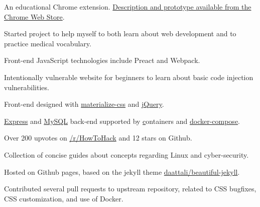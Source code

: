 

\begin{cventries}
  {
    \begin{cvitems}
      \item{An educational Chrome extension. \href{https://chrome.google.com/webstore/detail/mind-matter/ailffedpjgpjbdadlieaccchpcdiafjc}{Description and prototype available from the Chrome Web Store}.}
      \item{Started project to help myself to both learn about web development and to practice medical vocabulary.}
      \item{Front-end JavaScript technologies include Preact and Webpack.}
    \end{cvitems}
  }
  {
    \begin{cvitems}
      \item{Intentionally vulnerable website for beginners to learn about basic code injection vulnerabilities.}
      \item{Front-end designed with \href{http://materializecss.com/}{materialize-css} and \href{https://jquery.com/}{jQuery}.}
      \item{\href{https://expressjs.com/}{Express} and \href{https://www.mysql.com/}{MySQL} back-end supported by \href{Docker} containers and \href{https://docs.docker.com/compose/overview/}{docker-compose}.}
      \item{Over 200 upvotes on \href{https://www.reddit.com/r/HowToHack/comments/7zcfqd/i_made_an_easytohack_web_application_for/?ref=share&ref_source=link}{/r/HowToHack} and 12 stars on Github.}
    \end{cvitems}
  }
  {
    \begin{cvitems}
      \item{Collection of concise guides about concepts regarding Linux and cyber-security.}
      \item{Hosted on Github pages, based on the jekyll theme \href{https://github.com/daattali/beautiful-jekyll}{daattali/beautiful-jekyll}.}
      \item{Contributed several pull requests to upstream repository, related to CSS bugfixes, CSS customization, and use of Docker.}
    \end{cvitems}
  }

\end{cventries}
